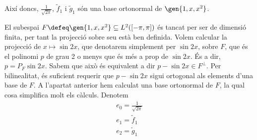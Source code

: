 \documentclass[12pt]{article}
\begin{document}
Així doncs, \( \frac{1}{\sqrt{2\pi}} \), \( \tilde{f}_1 \) i \( \tilde{g}_1 \) són una
base ortonormal de \( \gen{1,x,x^2} \).

\parbreak

El subespai \( F \defeq \gen{1,x,x^2} \subseteq L^2([-\pi, \pi]) \) és tancat per ser de
dimensió finita, per tant la projecció sobre seu està ben definida. Volem calcular la
projecció de \( x \mapsto \sin{2x} \), que denotarem simplement per \( \sin{2x} \), sobre
\( F \), que és el polinomi \( p \) de grau 2 o menys que és més a prop de \( \sin{2x} \).
És a dir, \( p = P_F \sin{2x} \). Sabem que això és equivalent a dir \( p - \sin{2x} \in
F^\perp \). Per bilinealitat, és suficient requerir que \( p - \sin{2x} \) sigui ortogonal
als elements d'una base de \( F \). A l'apartat anterior hem calculat una base ortonormal
de \( F \), la qual cosa simplifica molt els càlculs. Denotem
\begin{gather*}
	e_0 = \frac{1}{\sqrt{2\pi}} \\
	e_1 = \tilde{f}_1 \\
	e_2 = \tilde{g}_1
\end{gather*}
\end{document}
